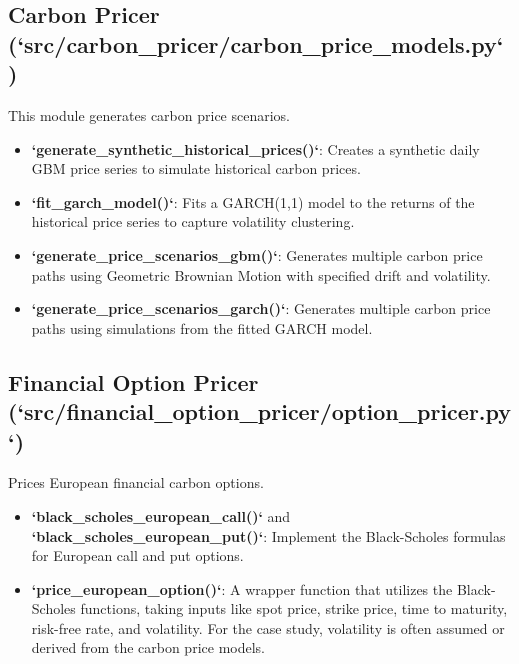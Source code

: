 \subsection{Carbon Pricer (`src/carbon_pricer/carbon_price_models.py`)}
This module generates carbon price scenarios.
\begin{itemize}
    \item \textbf{`generate_synthetic_historical_prices()`}: Creates a synthetic daily GBM price series to simulate historical carbon prices.
    \item \textbf{`fit_garch_model()`}: Fits a GARCH(1,1) model to the returns of the historical price series to capture volatility clustering.
    \item \textbf{`generate_price_scenarios_gbm()`}: Generates multiple carbon price paths using Geometric Brownian Motion with specified drift and volatility.
    \item \textbf{`generate_price_scenarios_garch()`}: Generates multiple carbon price paths using simulations from the fitted GARCH model.
\end{itemize}

\subsection{Financial Option Pricer (`src/financial_option_pricer/option_pricer.py`)}
Prices European financial carbon options.
\begin{itemize}
    \item \textbf{`black_scholes_european_call()`} and \textbf{`black_scholes_european_put()`}: Implement the Black-Scholes formulas for European call and put options.
    \item \textbf{`price_european_option()`}: A wrapper function that utilizes the Black-Scholes functions, taking inputs like spot price, strike price, time to maturity, risk-free rate, and volatility. For the case study, volatility is often assumed or derived from the carbon price models.
\end{itemize}

